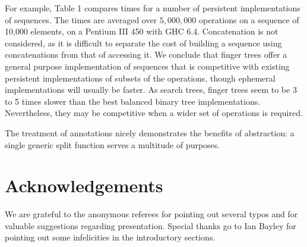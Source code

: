 \documentclass[10pt]{article}
\begin{document}
For example, Table 1 compares times for a number of persistent implementations of sequences. The times are averaged over $5,000,000$ operations on a sequence of 10,000 elements, on a Pentium III 450 with GHC 6.4. Concatenation is not considered, as it is difficult to separate the cost of building a sequence using concatenations from that of accessing it. We conclude that finger trees offer a general purpose implementation of sequences that is competitive with existing persistent implementations of subsets of the operations, though ephemeral implementations will usually be faster. As search trees, finger trees seem to be 3 to 5 times slower than the best balanced binary tree implementations. Nevertheless, they may be competitive when a wider set of operations is required.

The treatment of annotations nicely demonstrates the benefits of abstraction: a single generic split function serves a multitude of purposes.

\section*{Acknowledgements}
We are grateful to the anonymous referees for pointing out several typos and for valuable suggestions regarding presentation. Special thanks go to Ian Bayley for pointing out some infelicities in the introductory sections.
\end{document}
